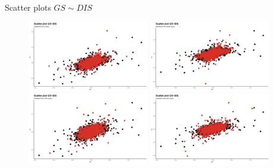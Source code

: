 \documentclass{beamer}
\begin{document}
\begin{frame}{Scatter plots $GS \sim DIS$}

\begin{figure}%
    \centering
    {{\includegraphics[width=5.3cm]{figures/GS_vs_DIS/GS_vs_DIS_t.jpeg} }}%
    \qquad
    {{\includegraphics[width=5.3cm]{figures/GS_vs_DIS/GS_vs_DIS_normal.jpeg} }} 
        \centering
    {{\includegraphics[width=5.3cm]{figures/GS_vs_DIS/GS_vs_DIS_cvine.jpeg} }}%
    \qquad
    {{\includegraphics[width=5.3cm]{figures/GS_vs_DIS/GS_vs_DIS_rvine.jpeg} }} 
\end{figure} 
    
\end{frame}
\end{document}
